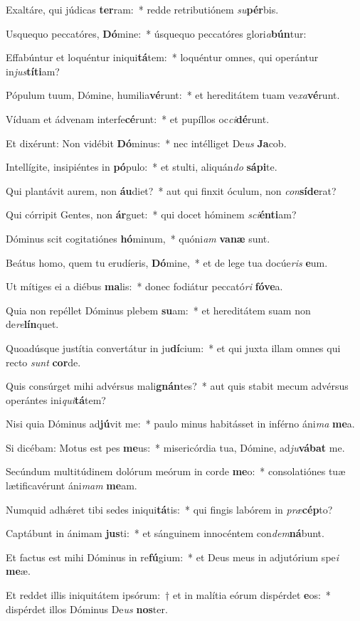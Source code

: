 \item Exaltáre, qui júdicas \textbf{ter}ram:~* redde retributiónem \textit{su}\textbf{pér}bis.
\item Usquequo peccatóres, \textbf{Dó}mine:~* úsquequo peccatóres glori\textit{a}\textbf{bún}tur:
\item Effabúntur et loquéntur iniqui\textbf{tá}tem:~* loquéntur omnes, qui operántur in\textit{jus}\textbf{tí}\textbf{ti}am?
\item Pópulum tuum, Dómine, humilia\textbf{vé}runt:~* et hereditátem tuam ve\textit{xa}\textbf{vé}runt.
\item Víduam et ádvenam interfe\textbf{cé}runt:~* et pupíllos oc\textit{ci}\textbf{dé}runt.
\item Et dixérunt: Non vidébit \textbf{Dó}minus:~* nec intélliget De\textit{us} \textbf{Ja}cob.
\item Intellígite, insipiéntes in \textbf{pó}pulo:~* et stulti, aliquán\textit{do} \textbf{sá}\textbf{pi}te.
\item Qui plantávit aurem, non \textbf{áu}diet?~* aut qui finxit óculum, non \textit{con}\textbf{sí}\textbf{de}rat?
\item Qui córripit Gentes, non \textbf{ár}guet:~* qui docet hóminem \textit{sci}\textbf{én}\textbf{ti}am?
\item Dóminus scit cogitatiónes \textbf{hó}minum,~* quóni\textit{am} \textbf{va}\textbf{næ} sunt.
\item Beátus homo, quem tu erudíeris, \textbf{Dó}mine,~* et de lege tua docúe\textit{ris} \textbf{e}um.
\item Ut mítiges ei a diébus \textbf{ma}lis:~* donec fodiátur peccató\textit{ri} \textbf{fó}\textbf{ve}a.
\item Quia non repéllet Dóminus plebem \textbf{su}am:~* et hereditátem suam non de\textit{re}\textbf{lín}quet.
\item Quoadúsque justítia convertátur in ju\textbf{dí}cium:~* et qui juxta illam omnes qui recto \textit{sunt} \textbf{cor}de.
\item Quis consúrget mihi advérsus mali\textbf{gnán}tes?~* aut quis stabit mecum advérsus operántes ini\textit{qui}\textbf{tá}tem?
\item Nisi quia Dóminus ad\textbf{jú}vit me:~* paulo minus habitásset in inférno áni\textit{ma} \textbf{me}a.
\item Si dicébam: Motus est pes \textbf{me}us:~* misericórdia tua, Dómine, ad\textit{ju}\textbf{vá}\textbf{bat} me.
\item Secúndum multitúdinem dolórum meórum in corde \textbf{me}o:~* consolatiónes tuæ lætificavérunt áni\textit{mam} \textbf{me}am.
\item Numquid adhǽret tibi sedes iniqui\textbf{tá}tis:~* qui fingis labórem in \textit{præ}\textbf{cép}to?
\item Captábunt in ánimam \textbf{jus}ti:~* et sánguinem innocéntem con\textit{dem}\textbf{ná}bunt.
\item Et factus est mihi Dóminus in re\textbf{fú}gium:~* et Deus meus in adjutórium spe\textit{i} \textbf{me}æ.
\item Et reddet illis iniquitátem ipsórum:~† et in malítia eórum dispérdet \textbf{e}os:~* dispérdet illos Dóminus De\textit{us} \textbf{nos}ter.
